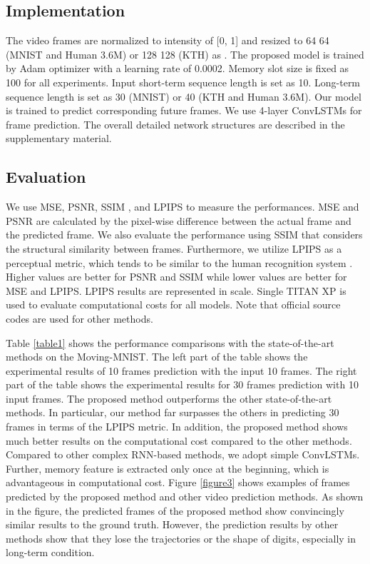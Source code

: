 \documentclass[final]{cvpr}
\begin{document}
\subsection{Implementation}
The video frames are normalized to intensity of [0, 1] and resized to 64  64 (MNIST and Human 3.6M) or 128  128 (KTH) as \cite{wang2018predrnn++,villegas2017decomposing,villegas2017learning}. The proposed model is trained by Adam optimizer \cite{kingma2014adam} with a learning rate of 0.0002. Memory slot size  is fixed as 100 for all experiments. Input short-term sequence length  is set as 10. Long-term sequence length  is set as 30 (MNIST) or 40 (KTH and Human 3.6M). Our model is trained to predict corresponding  future frames. We use 4-layer ConvLSTMs for frame prediction.  The overall detailed network structures are described in the supplementary material. 


\subsection{Evaluation}
We use MSE, PSNR, SSIM \cite{wang2004image}, and LPIPS \cite{zhang2018unreasonable} to measure the performances. MSE and PSNR are calculated by the pixel-wise difference between the actual frame and the predicted frame. We also evaluate the performance using SSIM that considers the structural similarity between frames. Furthermore, we utilize LPIPS as a perceptual metric, which tends to be similar to the human recognition system \cite{zhang2018unreasonable}. Higher values are better for PSNR and SSIM while lower values are better for MSE and LPIPS. LPIPS results are represented in  scale. Single TITAN XP is used to evaluate computational costs for all models. Note that official source codes are used for other methods. 

Table \ref{table1} shows the performance comparisons with the state-of-the-art methods on the Moving-MNIST. The left part of the table shows the experimental results of 10 frames prediction with the input 10 frames. The right part of the table shows the experimental results for 30 frames prediction with 10 input frames. The proposed method outperforms the other state-of-the-art methods. In particular, our method far surpasses the others in predicting 30 frames in terms of the LPIPS metric. In addition, the proposed method shows much better results on the computational cost compared to the other methods. Compared to other complex RNN-based methods, we adopt simple ConvLSTMs. Further, memory feature  is extracted only once at the beginning, which is advantageous in computational cost. Figure \ref{figure3} shows examples of frames predicted by the proposed method and other video prediction methods. As shown in the figure, the predicted frames of the proposed method show convincingly similar results to the ground truth. However, the prediction results by other methods show that they lose the trajectories or the shape of digits, especially in long-term condition.
\end{document}
